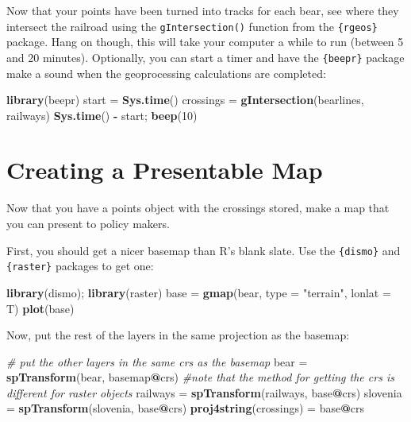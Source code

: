 \documentclass[]{book}
\newenvironment{Shaded}{\begin{snugshade}}{\end{snugshade}}
\newcommand{\CommentTok}[1]{\textcolor[rgb]{0.56,0.35,0.01}{\textit{#1}}}
\newcommand{\DataTypeTok}[1]{\textcolor[rgb]{0.13,0.29,0.53}{#1}}
\newcommand{\DecValTok}[1]{\textcolor[rgb]{0.00,0.00,0.81}{#1}}
\newcommand{\KeywordTok}[1]{\textcolor[rgb]{0.13,0.29,0.53}{\textbf{#1}}}
\newcommand{\NormalTok}[1]{#1}
\newcommand{\OperatorTok}[1]{\textcolor[rgb]{0.81,0.36,0.00}{\textbf{#1}}}
\newcommand{\StringTok}[1]{\textcolor[rgb]{0.31,0.60,0.02}{#1}}
\begin{document}
Now that your points have been turned into tracks for each bear, see where they intersect the railroad using the \texttt{gIntersection()} function from the \texttt{\{rgeos\}} package. Hang on though, this will take your computer a while to run (between 5 and 20 minutes). Optionally, you can start a timer and have the \texttt{\{beepr\}} package \citep{R-beepr} make a sound when the geoprocessing calculations are completed:

\begin{Shaded}
\begin{Highlighting}[]
\KeywordTok{library}\NormalTok{(beepr)}
\NormalTok{start =}\StringTok{ }\KeywordTok{Sys.time}\NormalTok{()}
\NormalTok{crossings =}\StringTok{ }\KeywordTok{gIntersection}\NormalTok{(bearlines, railways) }
\KeywordTok{Sys.time}\NormalTok{() }\OperatorTok{-}\StringTok{ }\NormalTok{start; }\KeywordTok{beep}\NormalTok{(}\DecValTok{10}\NormalTok{)}
\end{Highlighting}
\end{Shaded}

\hypertarget{base-maps}{%
\section{Creating a Presentable Map}\label{base-maps}}

Now that you have a points object with the crossings stored, make a map that you can present to policy makers.

First, you should get a nicer basemap than R's blank slate. Use the \texttt{\{dismo\}} \citep{R-dismo} and \texttt{\{raster\}} \citep{R-raster} packages to get one:

\begin{Shaded}
\begin{Highlighting}[]
\KeywordTok{library}\NormalTok{(dismo); }\KeywordTok{library}\NormalTok{(raster)}
\NormalTok{base =}\StringTok{ }\KeywordTok{gmap}\NormalTok{(bear, }\DataTypeTok{type =} \StringTok{"terrain"}\NormalTok{, }\DataTypeTok{lonlat =}\NormalTok{ T)}
\KeywordTok{plot}\NormalTok{(base)}
\end{Highlighting}
\end{Shaded}

Now, put the rest of the layers in the same projection as the basemap:

\begin{Shaded}
\begin{Highlighting}[]
\CommentTok{# put the other layers in the same crs as the basemap}
\NormalTok{bear =}\StringTok{ }\KeywordTok{spTransform}\NormalTok{(bear, basemap}\OperatorTok{@}\NormalTok{crs) }\CommentTok{#note that the method for getting the crs is different for raster objects}
\NormalTok{railways =}\StringTok{ }\KeywordTok{spTransform}\NormalTok{(railways, base}\OperatorTok{@}\NormalTok{crs)}
\NormalTok{slovenia =}\StringTok{ }\KeywordTok{spTransform}\NormalTok{(slovenia, base}\OperatorTok{@}\NormalTok{crs)}
\KeywordTok{proj4string}\NormalTok{(crossings) =}\StringTok{ }\NormalTok{base}\OperatorTok{@}\NormalTok{crs}
\end{Highlighting}
\end{Shaded}
\end{document}
